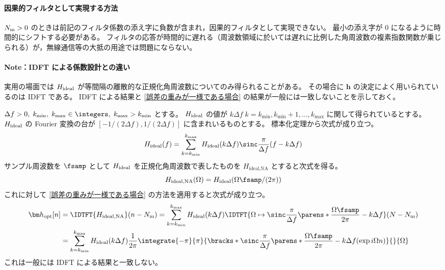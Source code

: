             \paragraph{因果的フィルタとして実現する方法}
                ${N_\text{m}}>0$ のときは前記のフィルタ係数の添え字に負数が含まれ，因果的フィルタとして実現できない。
                最小の添え字が 0 になるように時間的にシフトする必要がある。
                フィルタの応答が時間的に遅れる（周波数領域に於いては遅れに比例した角周波数の複素指数関数が乗じられる）が，無線通信等の大抵の用途では問題にならない。
            \paragraph{Note：IDFT による係数設計との違い}
                \newcommand{\kmin}{{k_\text{min}}}
                \newcommand{\kmax}{{k_\text{max}}}
                \newcommand{\HidealNA}{H_\text{ideal,NA}}
                実用の場面では $H_\text{ideal}$ が等間隔の離散的な正規化角周波数についてのみ得られることがある。
                その場合に $\bm{h}$ の決定によく用いられているのは IDFT である。
                IDFT による結果と \ref{誤差の重みが一様である場合} の結果が一般には一致しないことを示しておく。
                \par
                $\Delta f>0,\;\kmin,\;\kmax\in\integers,\;\kmax>\kmin$ とする。
                $H_\text{ideal}$ の値が $k\Delta f\;k=\kmin,\kmin+1,\dots,\kmax$ に関して得られているとする。
                $H_\text{ideal}$ の Fourier 変換の台が $[-1/(2\Delta f),1/(2\Delta f)]$ に含まれいるものとする。
                標本化定理から次式が成り立つ。
                \[ \Hideal(f) = \sum_{k=\kmin}^\kmax \Hideal(k\Delta f)\sinc\frac{\pi}{\Delta f}(f-k\Delta f) \]
                サンプル周波数を $\fsamp$ として $H_\text{ideal}$ を正規化角周波数で表したものを $\HidealNA$ とすると次式を得る。
                \[ \HidealNA(\Omega) = \Hideal(\Omega\fsamp/(2\pi)) \]
                これに対して \ref{誤差の重みが一様である場合} の方法を適用すると次式が成り立つ。
                \begin{align*}
                    \vhOpt[n] &= \IDTFT{\HidealNA}(n-\Nm) = \sum_{k=\kmin}^\kmax \Hideal(k\Delta f)\IDTFT{\Omega\mapsto\sinc\frac{\pi}{\Delta f}\parens*{\frac{\Omega\fsamp}{2\pi}-k\Delta f}}(N-\Nm) \\
                    &= \sum_{k=\kmin}^\kmax \Hideal(k\Delta f)\frac{1}{2\pi}\integrate{-\pi}{\pi}{\bracks*{\sinc\frac{\pi}{\Delta f}\parens*{\frac{\Omega\fsamp}{2\pi}-k\Delta f}}(\exp i\Omega n)}{}{\Omega}
                \end{align*}
                これは一般には IDFT による結果と一致しない。
